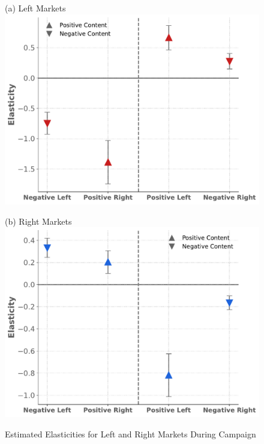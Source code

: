 \documentclass[12pt]{article}
\begin{document}
	 \begin{figure}[!htbp]
	 	\centering
	 	\caption{Estimated Elasticities for Left and Right Markets During Campaign}
	 	\label{fig:elasticities_campaign}
	 	\vspace{0.5em} %
	 	
	 	\begin{minipage}{0.45\textwidth}
	 		\centering
	 		(a) Left Markets\\
	 		\includegraphics[width=\linewidth]{figures/elasticities_left_campaign_v4}
	 	\end{minipage}
	 	\hfill
	 	\begin{minipage}{0.45\textwidth}
	 		\centering
	 		\vspace{1.5em}
	 		(b) Right Markets \\
	 		\includegraphics[width=\linewidth]{figures/elasticities_right_campaign_v4}
	 		\label{fig:2figsA}
	 	\end{minipage}
	 	

\end{figure}
\end{document}
